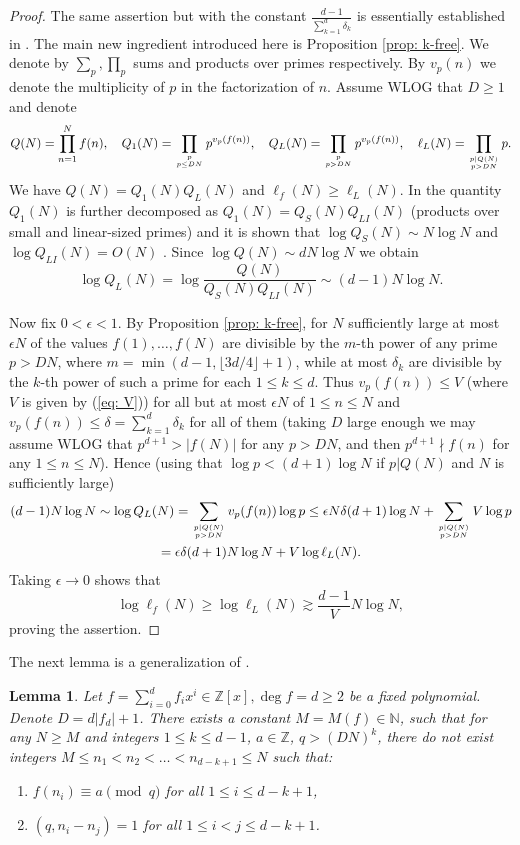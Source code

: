\documentclass[alphabetic]{amsart}
\newtheorem{lem}[claim]{Lemma}
\theoremstyle{definition}
\numberwithin{equation}{section}
\newcommand{\Z}{{\mathbb Z}}
\newcommand{\N}{{\mathbb N}}
\numberwithin{equation}{section}
\begin{document}
\begin{proof}
 The same assertion but with the constant $\frac{d-1}{\sum_{k=1}^d\delta_k}$ is essentially established in \cite[Proof of Theorem 1.4]{Sah20}. The main new ingredient introduced here is Proposition \ref{prop: k-free}.
We denote by $\sum_p,\prod_p$ sums and products over primes respectively. By $v_p(n)$ we denote the multiplicity of $p$ in the factorization of $n$. Assume WLOG that $D\ge 1$ and denote $$Q(N)=\prod_{n=1}^Nf(n),\quad Q_1(N)=\prod_{p\atop{p\le DN}}p^{v_p(f(n))},\quad Q_L(N)=\prod_{p\atop{p> DN}}p^{v_p(f(n))},\quad \ell_L(N)=\prod_{p|Q(N)\atop{p> DN}}p.$$
We have $Q(N)=Q_1(N)Q_L(N)$ and 
$\ell_f(N)\ge\ell_L(N)$. In \cite{Sah20} 
the quantity $Q_1(N)$ is further 
decomposed as $Q_1(N)=Q_S(N)Q_{LI}(N)$ 
(products over small and linear-sized 
primes) and it is shown that $\log Q_S(N)\sim 
N\log N$ \cite[Proposition 2.1]{Sah20} and 
$\log Q_{LI}(N)=O(N)$ \cite[Proposition 
3.1]{Sah20}. Since $\log Q(N)\sim dN\log 
N$ we obtain
$$\log Q_L(N)=\log\frac{Q(N)}{Q_S(N)Q_{LI}(N)}\sim (d-1)N\log N.$$

Now fix $0<\epsilon<1$. By Proposition \ref{prop: k-free}, for $N$ sufficiently large at most $\epsilon N$ of the values $f(1),\ldots,f(N)$ are divisible by the $m$-th power of any prime $p>DN$, where $m=\min(d-1,\lfloor 3d/4\rfloor+1)$, while at most $\delta_k$ are divisible by the $k$-th power of such a prime for each $1\le k\le d$.
Thus $v_p(f(n))\le V$ (where $V$ is given by (\ref{eq: V})) for all but at most $\epsilon N$ of $1\le n\le N$ and $v_p(f(n))\le\delta=\sum_{k=1}^d\delta_k$ for all of them (taking $D$ large enough we may assume WLOG that $p^{d+1}>|f(N)|$ for any $p>DN$, and then $p^{d+1}\nmid f(n)$ for any $1\le n\le N$). Hence (using that $\log p<(d+1)\log N$ if $p|Q(N)$ and $N$ is sufficiently large)
\begin{multline*}(d-1)N\log N\sim\log Q_L(N)=\sum_{p|Q(N)\atop{p>DN}}v_p(f(n))\log p\le \epsilon N\delta(d+1)\log N +\sum_{p|Q(N)\atop{p>DN}}V\log p\\=
\epsilon\delta (d+1)N\log N+V\log\ell_L(N).\end{multline*}
Taking $\epsilon\to 0$ shows that
$$\log \ell_f(N)\ge\log \ell_L(N)\gtrsim\frac{d-1}{V}N\log N,$$ proving the assertion.
\end{proof}

The next lemma is a generalization of \cite[Lemma 4.1]{Sah20}.

\begin{lem}\label{lem: sah} Let $f=\sum_{i=0}^df_ix^i\in\Z[x], \deg f=d\ge 2$ be a fixed polynomial. Denote $D=d|f_d|+1$. There exists a constant $M=M(f)\in\N$, such that for any $N\ge M$ and integers $1\le k\le d-1$, $a\in\Z$, $q>(DN)^k$, there do not exist integers $M\le n_1<n_2<\ldots<n_{d-k+1}\le N$ such that:
\begin{enumerate}
    \item[(a)] $f(n_i)\equiv a\pmod q$ for all $1\le i\le d-k+1$,
    \item[(b)] $(q, n_i-n_j)=1$ for all $1\le i<j\le d-k+1$.
\end{enumerate}
\end{lem}
\end{document}
